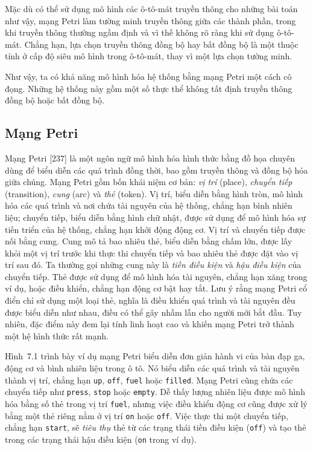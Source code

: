 Mặc dù có thể sử dụng mô hình các ô-tô-mát truyền thông cho những bài toán như vậy, mạng Petri làm tường minh truyền thông giữa các thành phần, trong khi truyền thông thường ngầm định và vì thế không rõ ràng khi sử dụng ô-tô-mát. Chẳng hạn, lựa chọn truyền thông đồng bộ hay bất đồng bộ là một thuộc tính ở cấp độ siêu mô hình trong ô-tô-mát, thay vì một lựa chọn tường minh.

Như vậy, ta có khả năng mô hình hóa hệ thống bằng mạng Petri một cách cô đọng. Những hệ thống này gồm một số thực thể không tất định truyền thông đồng bộ hoặc bất đồng bộ.

\subsection{Mạng Petri}
Mạng Petri [237] là một ngôn ngữ mô hình hóa hình thức bằng đồ họa chuyên dùng để biểu diễn các quá trình đồng thời, bao gồm truyền thông và đồng bộ hóa giữa chúng. Mạng Petri gồm bốn khái niệm cơ bản: \emph{vị trí} (place), \emph{chuyển tiếp} (transition), \emph{cung} (arc) và \emph{thẻ} (token). Vị trí, biểu diễn bằng hình tròn, mô hình hóa các quá trình và nơi chứa tài nguyên của hệ thống, chẳng hạn bình nhiên liệu; chuyển tiếp, biểu diễn bằng hình chữ nhật, được sử dụng để mô hình hóa sự tiến triển của hệ thống, chẳng hạn khởi động động cơ. Vị trí và chuyển tiếp được nối bằng cung. Cung mô tả bao nhiêu thẻ, biểu diễn bằng chấm lớn, được lấy khỏi một vị trí trước khi thực thi chuyển tiếp và bao nhiêu thẻ được đặt vào vị trí sau đó. Ta thường gọi những cung này là \emph{tiền điều kiện} và \emph{hậu điều kiện} của chuyển tiếp. Thẻ được sử dụng để mô hình hóa tài nguyên, chẳng hạn xăng trong ví dụ, hoặc điều khiển, chẳng hạn động cơ bật hay tắt. Lưu ý rằng mạng Petri cổ điển chỉ sử dụng một loại thẻ, nghĩa là điều khiển quá trình và tài nguyên đều được biểu diễn như nhau, điều có thể gây nhầm lẫn cho người mới bắt đầu. Tuy nhiên, đặc điểm này đem lại tính linh hoạt cao và khiến mạng Petri trở thành một hệ hình thức rất mạnh.

Hình~7.1 trình bày ví dụ mạng Petri biểu diễn đơn giản hành vi của bàn đạp ga, động cơ và bình nhiên liệu trong ô tô. Nó biểu diễn các quá trình và tài nguyên thành vị trí, chẳng hạn \texttt{up}, \texttt{off}, \texttt{fuel} hoặc \texttt{filled}. Mạng Petri cũng chứa các chuyển tiếp như \texttt{press}, \texttt{stop} hoặc \texttt{empty}. Dễ thấy lượng nhiên liệu được mô hình hóa bằng số thẻ trong vị trí \texttt{fuel}, nhưng việc điều khiển động cơ cũng được xử lý bằng một thẻ riêng nằm ở vị trí \texttt{on} hoặc \texttt{off}. Việc thực thi một chuyển tiếp, chẳng hạn \texttt{start}, sẽ \emph{tiêu thụ} thẻ từ các trạng thái tiền điều kiện (\texttt{off}) và tạo thẻ trong các trạng thái hậu điều kiện (\texttt{on} trong ví dụ).

